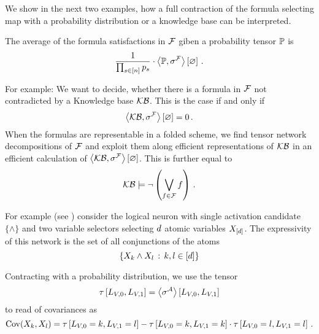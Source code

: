 
We show in the next two examples, how a full contraction of the formula selecting map with a probability distribution or a knowledge base can be interpreted.

\begin{example}
    The average of the formula satisfactions in $\mathcal{F}$ giben a probability tensor $\mathbb{P}$ is
    \[ \frac{1}{\prod_{s\in[n]}p_{s}} \cdot \left\langle \mathbb{P},\sigma^{\mathcal{F}}\right\rangle \left[ \varnothing \right] \, . \]
\end{example}


\begin{example}
    For example: We want to decide, whether there is a formula in $\mathcal{F}$ not contradicted by a Knowledge base $\mathcal{KB}$.
    This is the case if and only if
    \[ \left\langle \mathcal{KB},\sigma^{\mathcal{F}}\right\rangle \left[ \varnothing \right] = 0 \, .  \]
    When the formulas are representable in a folded scheme, we find tensor network decompositions of $\mathcal{F}$ and exploit them along efficient representations of $\mathcal{KB}$ in an efficient calculation of $\left\langle \mathcal{KB},\sigma^{\mathcal{F}}\right\rangle \left[ \varnothing \right] $.
    This is further equal to
    \[ \mathcal{KB} \models \lnot \left( \bigvee_{f\in\mathcal{F}} f\right) \, . \]
\end{example}




For example (see ) consider the logical neuron with single activation candidate $\{\land\}$ and two variable selectors selecting $d$ atomic variables $X_{[d]}$.
The expressivity of this network is the set of all conjunctions of the atoms
\[ \{X_{k} \land X_{l} \,:\, k,l\in[d] \} \]


Contracting with a probability distribution, we use the tensor
\[ \tau\left[L_{V,0},L_{V,1}\right] = \left\langle \sigma^{\mathcal{A}}\right\rangle \left[ L_{V,0},L_{V,1} \right] \]
to read of covariances as
\[ \mathrm{Cov}(X_{k},X_{l}) = \tau\left[L_{V,0}=k,L_{V,1}=l\right]  -
\tau\left[L_{V,0}=k,L_{V,1}=k\right]  \cdot \tau\left[L_{V,0}=l,L_{V,1}=l\right] \, .  \]


